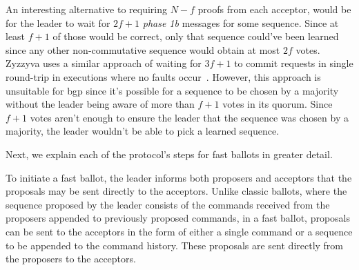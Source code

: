 {An interesting alternative to requiring $N-f$ proofs from each acceptor, would be for the leader to wait for $2f+1$ \textit{phase 1b} messages for some sequence. Since at least $f+1$ of those would be correct, only that sequence could've been learned since any other non-commutative sequence would obtain at most $2f$ votes. Zyzzyva uses a similar approach of waiting for $3f+1$ to commit requests in single round-trip in executions where no faults occur~\cite{Kotla:2008}. However, this approach is unsuitable for \acrshort{bgp} since it's possible for a sequence to be chosen by a majority without the leader being aware of more than $f+1$ votes in its quorum. Since $f+1$ votes aren't enough to ensure the leader that the sequence was chosen by a majority, the leader wouldn't be able to pick a learned sequence.}\par
Next, we explain each of the protocol's steps for fast ballots in greater detail.

To initiate a fast ballot, the leader informs both proposers and acceptors that the proposals may be sent directly to the acceptors. Unlike classic ballots, where the sequence proposed by the leader consists of the commands received from the proposers appended to previously proposed commands, in a fast ballot, proposals can be sent to the acceptors in the form of either a single command or a sequence to be appended to the command history. These proposals are sent directly from the proposers to the acceptors.\par

